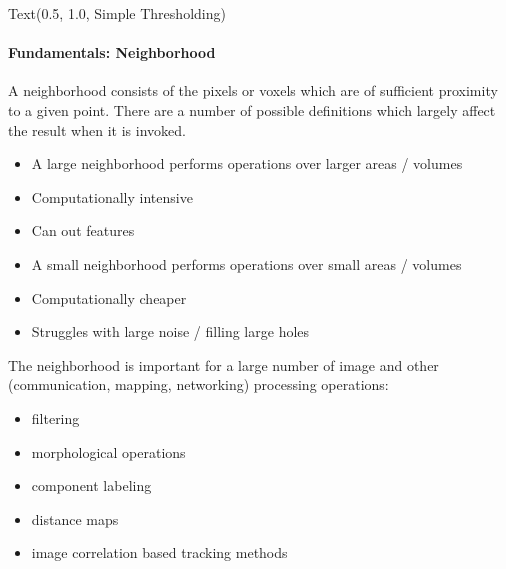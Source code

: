 \documentclass[letterpaper,10pt,english]{sphinxmanual}
\begin{document}
\begin{sphinxVerbatim}[commandchars=\\\{\}]
Text(0.5, 1.0, \PYGZsq{}Simple Thresholding\PYGZsq{})
\end{sphinxVerbatim}

\noindent{}


\paragraph{Fundamentals: Neighborhood}
\label{\detokenize{04-BasicSegmentation_Part2:fundamentals-neighborhood}}
\sphinxAtStartPar
A neighborhood consists of the pixels or voxels which are of sufficient proximity to a given point. There are a number of possible definitions which largely affect the result when it is invoked.
\begin{itemize}
\item {} 
\sphinxAtStartPar
A large neighborhood performs operations over larger areas / volumes

\item {} 
\sphinxAtStartPar
Computationally intensive

\item {} 
\sphinxAtStartPar
Can  out features

\item {} 
\sphinxAtStartPar
A small neighborhood performs operations over small areas / volumes

\item {} 
\sphinxAtStartPar
Computationally cheaper

\item {} 
\sphinxAtStartPar
Struggles with large noise / filling large holes

\end{itemize}

\sphinxAtStartPar
The neighborhood is important for a large number of image and other (communication, mapping, networking) processing operations:
\begin{itemize}
\item {} 
\sphinxAtStartPar
filtering

\item {} 
\sphinxAtStartPar
morphological operations

\item {} 
\sphinxAtStartPar
component labeling

\item {} 
\sphinxAtStartPar
distance maps

\item {} 
\sphinxAtStartPar
image correlation based tracking methods

\end{itemize}
\end{document}

